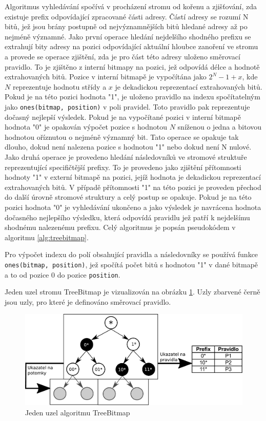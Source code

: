 Algoritmus vyhledávání spočívá v procházení stromu od kořenu a zjišťování, zda
existuje prefix odpovídající zpracované části adresy. Částí adresy se rozumí N bitů, jež jsou brány postupně
od nejvýznamnějších bitů hledané adresy až po nejméně významné.
Jako první operace hledání nejdelšího shodného prefixu se extrahují bity adresy na pozici odpovídající
aktuální hloubce zanoření ve stromu a provede se operace zjištění, zda je pro část této adresy uloženo
směrovací pravidlo. To je zjištěno z interní bitmapy na pozici, jež odpovídá délce a hodnotě extrahovaných bitů.
Pozice v interní bitmapě je vypočítána jako $2^{N} - 1 + x$, kde $N$ reprezentuje hodnotu střídy a $x$
je dekadickou reprezentací extrahovaných bitů.
Pokud je na této pozici
hodnota "1", je uloženo pravidlo na indexu spočítatelným jako \texttt{ones(bitmap, position)} v poli pravidel.
Toto pravidlo pak reprezentuje dočasný nejlepší výsledek. Pokud je na vypočítané
pozici v interní bitmapě hodnota "0" je opakován výpočet pozice s hodnotou $N$ sníženou o jedna a bitovou hodnotou
oříznutou o nejméně významný bit. Tato operace se opakuje tak dlouho, dokud není nalezena pozice
s hodnotou "1"
nebo dokud není N nulové. Jako druhá operace je provedeno hledání následovníků ve stromové struktuře
reprezentující specifičtější prefixy. To je provedeno jako zjištění přítomnosti hodnoty "1" v externí
bitmapě na pozici, jejíž hodnota je dekadickou reprezentací extrahovaných bitů. V případě přítomnosti
"1" na této pozici je proveden přechod do další úrovně stromové struktury a celý postup se opakuje.
Pokud je na této pozici hodnota "0" je vyhledávání ukončeno a jako výsledek je navrácena hodnota
dočasného nejlepšího výsledku, která odpovídá pravidlu jež patří k nejdelšímu shodnému nalezenému
prefixu. Celý algoritmus je popsán pseudokódem v algoritmu \ref{alg:treebitmap}.

Pro výpočet indexu do polí obsahující pravidla a následovníky se používá funkce
\texttt{ones(bitmap, position)}, jež
spočítá počet bitů s hodnotou "1" v dané bitmapě a to od pozice 0 do pozice \texttt{position}.

Jeden uzel stromu TreeBitmap je vizualizován na obrázku \ref{fig:tbm-node}. Uzly zbarvené černě
jsou uzly, pro které je definováno směrovací pravidlo.

\begin{figure}[!htbp]
    \centering
    \includegraphics[scale=.55]{fig/tbm.pdf}
    \caption{Jeden uzel algoritmu TreeBitmap}
    \label{fig:tbm-node}
\end{figure}

